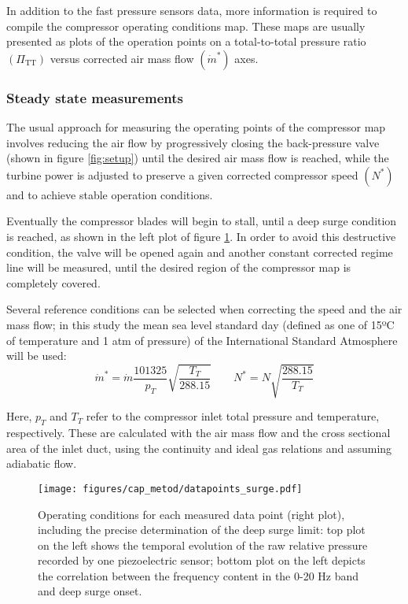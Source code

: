 In addition to the fast pressure sensors data, more information is required to compile the compressor operating conditions map. These maps are usually presented as plots of the operation points on a total-to-total pressure ratio $(\Pi_\text{TT})$ versus corrected air mass flow $(\dot m^*)$ axes.

\subsubsection{Steady state measurements}
\label{sub:steady_state_measurements}

The usual approach for measuring the operating points of the compressor map involves reducing the air flow by progressively closing the back-pressure valve (shown in figure \ref{fig:setup}) until the desired air mass flow is reached, while the turbine power is adjusted to preserve a given corrected compressor speed $(N^*)$ and to achieve stable operation conditions.

Eventually the compressor blades will begin to stall, until a deep surge condition is reached, as shown in the left plot of figure \ref{fig:surge_datapoints}. In order to avoid this destructive condition, the valve will be opened again and another constant corrected regime line will be measured, until the desired region of the compressor map is completely covered.

Several reference conditions can be selected when correcting the speed and the air mass flow; in this study the mean sea level standard day (defined as one of 15ºC of temperature and 1 atm of pressure) of the International Standard Atmosphere will be used:
\begin{equation}
    \dot m^* = \dot m\frac{101325}{p_{T}}\sqrt{\frac{T_{T}}{288.15}}
    \qquad N^*=N\sqrt{\frac{288.15}{T_{T}}}
\end{equation}

Here, $p_{T}$ and $T_{T}$ refer to the compressor inlet total pressure and temperature, respectively. These are calculated with the air mass flow and the cross sectional area of the inlet duct, using the continuity and ideal gas relations and assuming adiabatic flow.

\begin{figure}[bth!]
\centering
\texttt{[image: figures/cap\_metod/datapoints\_surge.pdf]}
\caption{Operating conditions for each measured data point (right plot), including the precise determination of the deep surge limit: top plot on the left shows the temporal evolution of the raw relative pressure recorded by one piezoelectric sensor; bottom plot on the left depicts the correlation between the frequency content in the 0-20 Hz band and deep surge onset.}
\label{fig:surge_datapoints}
\end{figure}

